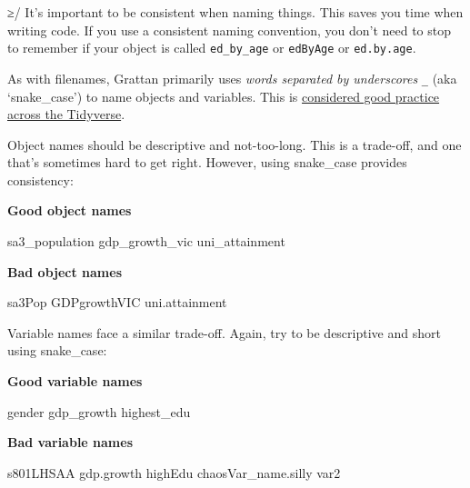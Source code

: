 \documentclass[]{book}
\newenvironment{Shaded}{\begin{snugshade}}{\end{snugshade}}
\newcommand{\NormalTok}[1]{#1}
\begin{document}
≥/
It's important to be consistent when naming things. This saves you time when writing code. If you use a consistent naming convention, you don't need to stop to remember if your object is called \texttt{ed\_by\_age} or \texttt{edByAge} or \texttt{ed.by.age}.

As with filenames, Grattan primarily uses \emph{words separated by underscores} \texttt{\_} (aka `snake\_case') to name objects and variables. This is \href{https://style.tidyverse.org/syntax.html\#object-names}{considered good practice across the Tidyverse}.

Object names should be descriptive and not-too-long. This is a trade-off, and one that's sometimes hard to get right. However, using snake\_case provides consistency:

\textbf{Good object names}

\begin{Shaded}
\begin{Highlighting}[]
\NormalTok{sa3_population}
\NormalTok{gdp_growth_vic}
\NormalTok{uni_attainment}
\end{Highlighting}
\end{Shaded}

\textbf{Bad object names}

\begin{Shaded}
\begin{Highlighting}[]
\NormalTok{sa3Pop}
\NormalTok{GDPgrowthVIC}
\NormalTok{uni.attainment}
\end{Highlighting}
\end{Shaded}

Variable names face a similar trade-off. Again, try to be descriptive and short using snake\_case:

\textbf{Good variable names}

\begin{Shaded}
\begin{Highlighting}[]
\NormalTok{gender}
\NormalTok{gdp_growth}
\NormalTok{highest_edu}
\end{Highlighting}
\end{Shaded}

\textbf{Bad variable names}

\begin{Shaded}
\begin{Highlighting}[]
\NormalTok{s801LHSAA}
\NormalTok{gdp.growth}
\NormalTok{highEdu}
\NormalTok{chaosVar_name.silly}
\NormalTok{var2}
\end{Highlighting}
\end{Shaded}
\end{document}
